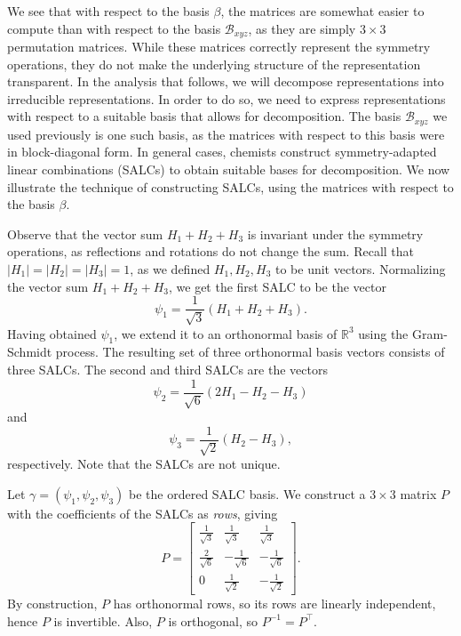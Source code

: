 \documentclass{article}
\begin{document}
    We see that with respect to the basis $\beta$, the matrices are somewhat easier to compute than with respect to the basis $\mathcal B_{xyz}$, as they are simply $3\times 3$ permutation matrices. While these matrices correctly represent the symmetry operations, they do not make the underlying structure of the representation transparent. In the analysis that follows, we will decompose representations into irreducible representations. In order to do so, we need to express representations with respect to a suitable basis that allows for decomposition. The basis $\mathcal B_{xyz}$ we used previously is one such basis, as the matrices with respect to this basis were in block-diagonal form. In general cases, chemists construct symmetry-adapted linear combinations (SALCs) to obtain suitable bases for decomposition. We now illustrate the technique of constructing SALCs, using the matrices with respect to the basis $\beta$.

    Observe that the vector sum $H_1+H_2+H_3$ is invariant under the symmetry operations, as reflections and rotations do not change the sum. Recall that $|H_1|=|H_2|=|H_3|=1$, as we defined $H_1,H_2,H_3$ to be unit vectors. Normalizing the vector sum $H_1+H_2+H_3$, we get the first SALC to be the vector
    \[\psi_1=\frac1{\sqrt{3}}(H_1+H_2+H_3).\] Having obtained $\psi_1$, we extend it to an orthonormal basis of $\mathbb{R}^3$ using the Gram-Schmidt process. The resulting set of three orthonormal basis vectors consists of three SALCs. The second and third SALCs are the vectors \[\psi_2=\frac1{\sqrt{6}}(2H_1-H_2-H_3)\] and \[\psi_3=\frac1{\sqrt{2}}(H_2-H_3),\] respectively. Note that the SALCs are not unique.
    
    Let $\gamma=(\psi_1,\psi_2,\psi_3)$ be the ordered SALC basis. We construct a $3\times 3$ matrix $P$ with the coefficients of the SALCs as \emph{rows}, giving \[P=\begin{bmatrix}\frac{1}{\sqrt3}&\frac{1}{\sqrt3}&\frac{1}{\sqrt3}\\\frac{2}{\sqrt{6}}&-\frac{1}{\sqrt{6}}&-\frac{1}{\sqrt{6}}\\0&\frac{1}{\sqrt{2}}&-\frac{1}{\sqrt{2}}\end{bmatrix}.\] By construction, $P$ has orthonormal rows, so its rows are linearly independent, hence $P$ is invertible. Also, $P$ is orthogonal, so $P^{-1}=P^\top$.
\end{document}
